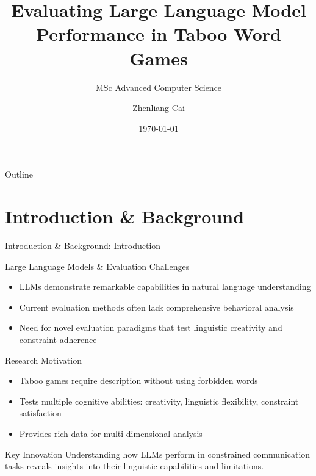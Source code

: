 \documentclass[aspectratio=169]{beamer}
\title{Evaluating Large Language Model Performance in Taboo Word Games}
\subtitle{MSc Advanced Computer Science}
\author{Zhenliang Cai}
\institute{University of Leeds}
\date{\today}
\begin{document}
\begin{frame}
\titlepage
\end{frame}

\begin{frame}{Outline}
\tableofcontents
\end{frame}

\section{Introduction \& Background}

\begin{frame}{Introduction \& Background: Introduction}
\begin{block}{Large Language Models \& Evaluation Challenges}
\begin{itemize}
    \item LLMs demonstrate remarkable capabilities in natural language understanding
    \item Current evaluation methods often lack comprehensive behavioral analysis
    \item Need for novel evaluation paradigms that test linguistic creativity and constraint adherence
\end{itemize}
\end{block}

\begin{block}{Research Motivation}
\begin{itemize}
    \item Taboo games require description without using forbidden words
    \item Tests multiple cognitive abilities: creativity, linguistic flexibility, constraint satisfaction
    \item Provides rich data for multi-dimensional analysis
\end{itemize}
\end{block}

\begin{alertblock}{Key Innovation}
Understanding how LLMs perform in constrained communication tasks reveals insights into their linguistic capabilities and limitations.
\end{alertblock}
\end{frame}
\end{document}
